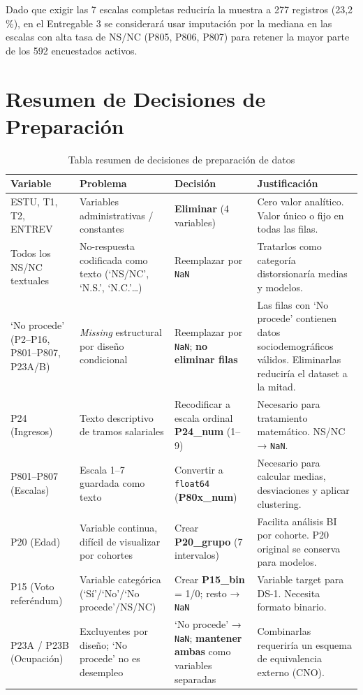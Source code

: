 \documentclass[12pt,a4paper]{article}
\newcommand{\thead}[1]{\cellcolor{tableheader}\color{white}\textbf{#1}}
\begin{document}
Dado que exigir las 7 escalas completas reduciría la muestra a 277 registros (23,2\,\%), en el Entregable 3 se considerará usar imputación por la mediana en las escalas con alta tasa de NS/NC (P805, P806, P807) para retener la mayor parte de los 592 encuestados activos.

\newpage

\section{Resumen de Decisiones de Preparación}

\begin{table}[H]
\centering
\renewcommand{\arraystretch}{1.6}
\begin{tabularx}{\linewidth}{p{2.8cm} p{3.2cm} p{2.8cm} X}
\toprule
\thead{Variable} & \thead{Problema} & \thead{Decisión} & \thead{Justificación} \\
\midrule
ESTU, T1, T2, ENTREV
  & Variables administrativas / constantes
  & \textbf{Eliminar} (4 variables)
  & Cero valor analítico. Valor único o fijo en todas las filas. \\
\rowcolor{tablerow}
Todos los NS/NC textuales
  & No-respuesta codificada como texto (`NS/NC', `N.S.', `N.C.'\ldots)
  & Reemplazar por \texttt{NaN}
  & Tratarlos como categoría distorsionaría medias y modelos. \\
`No procede' (P2--P16, P801--P807, P23A/B)
  & \textit{Missing} estructural por diseño condicional
  & Reemplazar por \texttt{NaN}; \textbf{no eliminar filas}
  & Las filas con `No procede' contienen datos sociodemográficos válidos. Eliminarlas reduciría el dataset a la mitad. \\
\rowcolor{tablerow}
P24 (Ingresos)
  & Texto descriptivo de tramos salariales
  & Recodificar a escala ordinal \textbf{P24\_num} (1--9)
  & Necesario para tratamiento matemático. NS/NC → \texttt{NaN}. \\
P801--P807 (Escalas)
  & Escala 1--7 guardada como texto
  & Convertir a \texttt{float64} (\textbf{P80x\_num})
  & Necesario para calcular medias, desviaciones y aplicar clustering. \\
\rowcolor{tablerow}
P20 (Edad)
  & Variable continua, difícil de visualizar por cohortes
  & Crear \textbf{P20\_grupo} (7 intervalos)
  & Facilita análisis BI por cohorte. P20 original se conserva para modelos. \\
P15 (Voto referéndum)
  & Variable categórica (`Sí'/`No'/`No procede'/NS/NC)
  & Crear \textbf{P15\_bin} = 1/0; resto → \texttt{NaN}
  & Variable target para DS-1. Necesita formato binario. \\
\rowcolor{tablerow}
P23A / P23B (Ocupación)
  & Excluyentes por diseño; `No procede' no es desempleo
  & `No procede' → \texttt{NaN}; \textbf{mantener ambas} como variables separadas
  & Combinarlas requeriría un esquema de equivalencia externo (CNO). \\
\bottomrule
\end{tabularx}
\caption{Tabla resumen de decisiones de preparación de datos}
\end{table}
\end{document}
